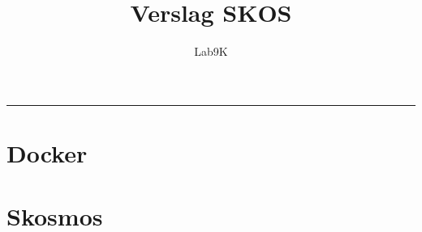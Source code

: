 \documentclass[12pt, letterpaper, oneside]{article}
\title{\textbf{Verslag SKOS}}
\date{}
\author{Lab9K}
\begin{document}
	
	\maketitle
	\par\noindent\rule{\textwidth}{0.4pt}
	
	\section{Docker}
	
	
	\section{Skosmos}
	
	
\end{document}
